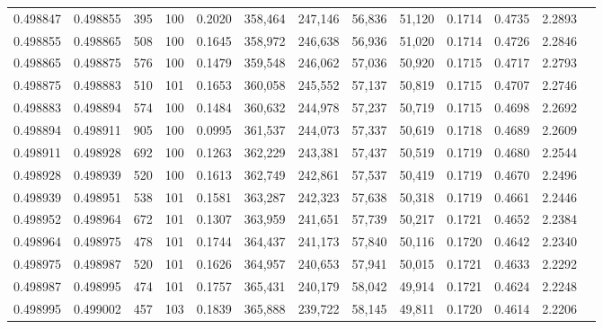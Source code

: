\begin{tabular}{rrrrrrrrrrrrr}
0.498847 & 0.498855 &   395 & 100 &                                     0.2020 & 358,464 & 247,146 &  56,836 &  51,120 & 0.1714 & 0.4735 & 2.2893 \\
0.498855 & 0.498865 &   508 & 100 &                                     0.1645 & 358,972 & 246,638 &  56,936 &  51,020 & 0.1714 & 0.4726 & 2.2846 \\
0.498865 & 0.498875 &   576 & 100 &                                     0.1479 & 359,548 & 246,062 &  57,036 &  50,920 & 0.1715 & 0.4717 & 2.2793 \\
0.498875 & 0.498883 &   510 & 101 &                                     0.1653 & 360,058 & 245,552 &  57,137 &  50,819 & 0.1715 & 0.4707 & 2.2746 \\
0.498883 & 0.498894 &   574 & 100 &                                     0.1484 & 360,632 & 244,978 &  57,237 &  50,719 & 0.1715 & 0.4698 & 2.2692 \\
0.498894 & 0.498911 &   905 & 100 &                                     0.0995 & 361,537 & 244,073 &  57,337 &  50,619 & 0.1718 & 0.4689 & 2.2609 \\
0.498911 & 0.498928 &   692 & 100 &                                     0.1263 & 362,229 & 243,381 &  57,437 &  50,519 & 0.1719 & 0.4680 & 2.2544 \\
0.498928 & 0.498939 &   520 & 100 &                                     0.1613 & 362,749 & 242,861 &  57,537 &  50,419 & 0.1719 & 0.4670 & 2.2496 \\
0.498939 & 0.498951 &   538 & 101 &                                     0.1581 & 363,287 & 242,323 &  57,638 &  50,318 & 0.1719 & 0.4661 & 2.2446 \\
0.498952 & 0.498964 &   672 & 101 &                                     0.1307 & 363,959 & 241,651 &  57,739 &  50,217 & 0.1721 & 0.4652 & 2.2384 \\
0.498964 & 0.498975 &   478 & 101 &                                     0.1744 & 364,437 & 241,173 &  57,840 &  50,116 & 0.1720 & 0.4642 & 2.2340 \\
0.498975 & 0.498987 &   520 & 101 &                                     0.1626 & 364,957 & 240,653 &  57,941 &  50,015 & 0.1721 & 0.4633 & 2.2292 \\
0.498987 & 0.498995 &   474 & 101 &                                     0.1757 & 365,431 & 240,179 &  58,042 &  49,914 & 0.1721 & 0.4624 & 2.2248 \\
0.498995 & 0.499002 &   457 & 103 &                                     0.1839 & 365,888 & 239,722 &  58,145 &  49,811 & 0.1720 & 0.4614 & 2.2206 \\

\end{tabular}
